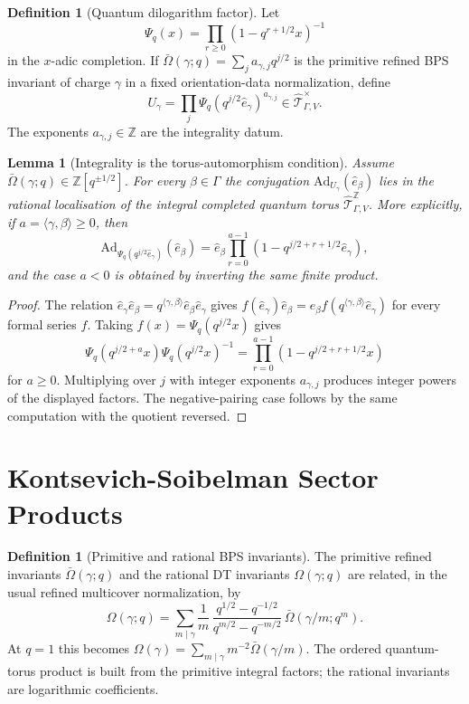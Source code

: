 \documentclass[11pt]{article}
\newtheorem{lemma}[theorem]{Lemma}
\theoremstyle{definition}
\newtheorem{definition}[theorem]{Definition}
\providecommand{\Z}{\mathbb{Z}}
\providecommand{\cT}{\mathcal{T}}
\providecommand{\Ad}{\mathrm{Ad}}
\begin{document}
\begin{definition}[Quantum dilogarithm factor]
Let
\[
 \Psi_q(x)=\prod_{r\geq0}(1-q^{r+1/2}x)^{-1}
\]
in the $x$-adic completion. If
$\bar\Omega(\gamma;q)=\sum_j a_{\gamma,j}q^{j/2}$ is the primitive
refined BPS invariant of charge $\gamma$ in a fixed orientation-data
normalization, define
\[
 U_\gamma
 =
 \prod_j \Psi_q(q^{j/2}\hat e_\gamma)^{a_{\gamma,j}}
 \in \widehat{\cT}_{\Gamma,V}^{\times}.
\]
The exponents $a_{\gamma,j}\in\Z$ are the integrality datum.
\end{definition}

\begin{lemma}[Integrality is the torus-automorphism condition]
\label{lem:integrality-automorphism}
Assume $\bar\Omega(\gamma;q)\in\Z[q^{\pm1/2}]$. For every
$\beta\in\Gamma$ the conjugation $\Ad_{U_\gamma}(\hat e_\beta)$ lies in
the rational localisation of the integral completed quantum torus
$\widehat{\cT}_{\Gamma,V}^{\Z}$. More explicitly, if
$a=\langle\gamma,\beta\rangle\geq0$, then
\[
 \Ad_{\Psi_q(q^{j/2}\hat e_\gamma)}(\hat e_\beta)
 =
 \hat e_\beta
 \prod_{r=0}^{a-1}
 (1-q^{j/2+r+1/2}\hat e_\gamma),
\]
and the case $a<0$ is obtained by inverting the same finite product.
\end{lemma}

\begin{proof}
The relation
$\hat e_\gamma\hat e_\beta=q^{\langle\gamma,\beta\rangle}
\hat e_\beta\hat e_\gamma$ gives
$f(\hat e_\gamma)\hat e_\beta
=\hat e_\beta f(q^{\langle\gamma,\beta\rangle}\hat e_\gamma)$ for every
formal series $f$. Taking $f(x)=\Psi_q(q^{j/2}x)$ gives
\[
 \Psi_q(q^{j/2+a}x)\Psi_q(q^{j/2}x)^{-1}
 =
 \prod_{r=0}^{a-1}(1-q^{j/2+r+1/2}x)
\]
for $a\geq0$. Multiplying over $j$ with integer exponents
$a_{\gamma,j}$ produces integer powers of the displayed factors. The
negative-pairing case follows by the same computation with the quotient
reversed.
\end{proof}

\section{Kontsevich-Soibelman Sector Products}

\begin{definition}[Primitive and rational BPS invariants]
The primitive refined invariants $\bar\Omega(\gamma;q)$ and the rational
DT invariants $\Omega(\gamma;q)$ are related, in the usual refined
multicover normalization, by
\[
 \Omega(\gamma;q)
 =
 \sum_{m\mid\gamma}
 \frac{1}{m}\,
 \frac{q^{1/2}-q^{-1/2}}{q^{m/2}-q^{-m/2}}\,
 \bar\Omega(\gamma/m;q^m).
\]
At $q=1$ this becomes
$\Omega(\gamma)=\sum_{m\mid\gamma}m^{-2}\bar\Omega(\gamma/m)$.
The ordered quantum-torus product is built from the primitive integral
factors; the rational invariants are logarithmic coefficients.
\end{definition}
\end{document}
